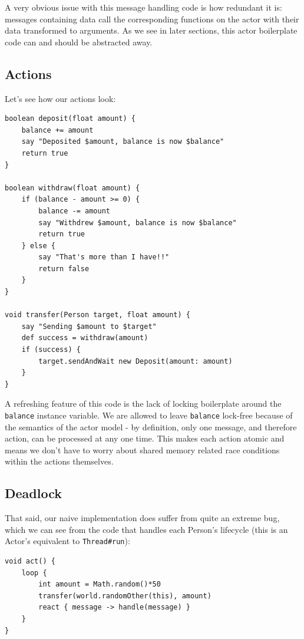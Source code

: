 \documentclass[a4paper,12pt]{kth-mag}
\begin{document}
A very obvious issue with this message handling code is how redundant it is: messages containing data call the corresponding functions on the actor with their data transformed to arguments. As we see in later sections, this actor boilerplate code can and should be abstracted away.

\subsection{Actions}

Let's see how our actions look:

\begin{listing}[H]
	\begin{verbatim}
boolean deposit(float amount) {
    balance += amount
    say "Deposited $amount, balance is now $balance"
    return true
}

boolean withdraw(float amount) {
    if (balance - amount >= 0) {
        balance -= amount
        say "Withdrew $amount, balance is now $balance"
        return true
    } else {
        say "That's more than I have!!"
        return false
    }
}

void transfer(Person target, float amount) {
    say "Sending $amount to $target"
    def success = withdraw(amount)
    if (success) { 
        target.sendAndWait new Deposit(amount: amount)
    } 
}
	\end{verbatim}
\end{listing}

A refreshing feature of this code is the lack of locking boilerplate around the \texttt{balance} instance variable. We are allowed to leave \texttt{balance} lock-free because of the semantics of the actor model - by definition, only one message, and therefore action, can be processed at any one time. This makes each action atomic and means we don't have to worry about shared memory related race conditions within the actions themselves.

\subsection{Deadlock}

That said, our naive implementation does suffer from quite an extreme bug, which we can see from the code that handles each Person's lifecycle (this is an Actor's equivalent to \texttt{Thread\#run}):

\begin{listing}[H]
	\begin{verbatim}
void act() {
    loop {
        int amount = Math.random()*50
        transfer(world.randomOther(this), amount)
        react { message -> handle(message) }
    }
}
	\end{verbatim}
\end{listing}
\end{document}
